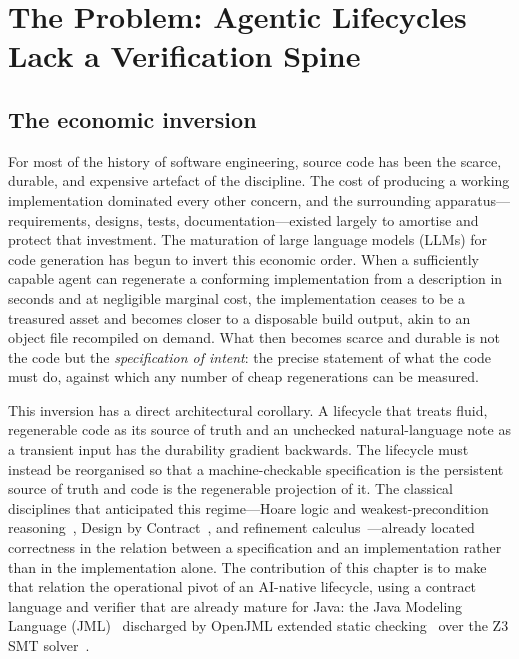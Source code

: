 \section{The Problem: Agentic Lifecycles Lack a Verification Spine}\label{sec:a5-motivation}

\subsection{The economic inversion}\label{subsec:a5-inversion}

For most of the history of software engineering, source code has been the scarce, durable, and expensive artefact of the discipline. The cost of producing a working implementation dominated every other concern, and the surrounding apparatus---requirements, designs, tests, documentation---existed largely to amortise and protect that investment. The maturation of large language models (LLMs) for code generation has begun to invert this economic order. When a sufficiently capable agent can regenerate a conforming implementation from a description in seconds and at negligible marginal cost, the implementation ceases to be a treasured asset and becomes closer to a disposable build output, akin to an object file recompiled on demand. What then becomes scarce and durable is not the code but the \emph{specification of intent}: the precise statement of what the code must do, against which any number of cheap regenerations can be measured.

This inversion has a direct architectural corollary. A lifecycle that treats fluid, regenerable code as its source of truth and an unchecked natural-language note as a transient input has the durability gradient backwards. The lifecycle must instead be reorganised so that a machine-checkable specification is the persistent source of truth and code is the regenerable projection of it. The classical disciplines that anticipated this regime---Hoare logic and weakest-precondition reasoning~\cite{hoare1969axiomatic,dijkstra1976discipline}, Design by Contract~\cite{meyer1992dbc,meyer1997oosc}, and refinement calculus~\cite{back1998refinement,morgan1994programming}---already located correctness in the relation between a specification and an implementation rather than in the implementation alone. The contribution of this chapter is to make that relation the operational pivot of an AI-native lifecycle, using a contract language and verifier that are already mature for Java: the Java Modeling Language (JML)~\cite{leavens2006jml} discharged by OpenJML extended static checking~\cite{cok2011openjml,cok2014openjml} over the Z3 SMT solver~\cite{demoura2008z3}.

